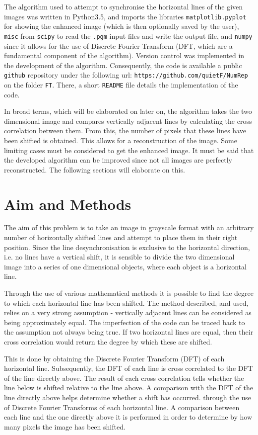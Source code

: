 \documentclass[a4paper,12pt]{article}
\begin{document}
The algorithm used to attempt to synchronise the horizontal lines of the given images was written in Python3.5, and imports the libraries \texttt{matplotlib.pyplot} for showing the enhanced image (which is then optionally saved by the user), \texttt{misc} from \texttt{scipy} to read the \texttt{.pgm} input files and write the output file, and \texttt{numpy} since it allows for the use of Discrete Fourier Transform (DFT, which are a fundamental component of the algorithm). Version control was implemented in the development of the algorithm. Consequently, the code is available a public \texttt{github} repository under the following url: \texttt{https://github.com/quietF/NumRep} on the folder \texttt{FT}. There, a short \texttt{README} file details the implementation of the code.

In broad terms, which will be elaborated on later on, the algorithm takes the two dimensional image and compares vertically adjacent lines by calculating the cross correlation between them. From this, the number of pixels that these lines have been shifted is obtained. This allows for a reconstruction of the image. Some limiting cases must be considered to get the enhanced image. It must be said that the developed algorithm can be improved since not all images are perfectly reconstructed. The following sections will elaborate on this. 

\section{Aim and Methods}

The aim of this problem is to take an image in grayscale format with an arbitrary number of horizontally shifted lines and attempt to place them in their right position. Since the line desynchronisation is exclusive to the horizontal direction, i.e. no lines have a vertical shift, it is sensible to divide the two dimensional image into a series of one dimensional objects, where each object is a horizontal line. 

Through the use of various mathematical methods it is possible to find the degree to which each horizontal line has been shifted. The method described, and used, relies on a very strong assumption - vertically adjacent lines can be considered as being approximately equal. The imperfection of the code can be traced back to the assumption not always being true. If two horizontal lines are equal, then their cross correlation would return the degree by which these are shifted. 

This is done by obtaining the Discrete Fourier Transform (DFT) of each horizontal line. Subsequently, the DFT of each line is cross correlated to the DFT of the line directly above. The result of each cross correlation tells whether the line below is shifted relative to the line above.  A comparison with the DFT of the line directly above helps determine whether a shift has occurred.  through the use of Discrete Fourier Transforms of each horizontal line. A comparison between each line and the one directly above it is performed in order to determine by how many pixels the image has been shifted. 




\end{document}

